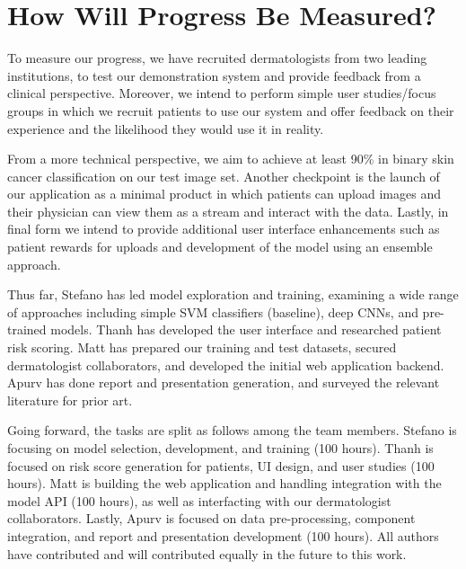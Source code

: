 \documentclass[a4paper,10pt]{article}
\begin{document}
\section{How Will Progress Be Measured?}
To measure our progress, we have recruited dermatologists from two leading
institutions, to test our demonstration system and provide feedback from a
clinical perspective. Moreover, we intend to perform simple user studies/focus
groups in which we recruit patients to use our system and offer feedback on
their experience and the likelihood they would use it in reality.

From a more technical perspective, we aim to achieve at least 90\% in binary
skin cancer classification on our test image set. Another checkpoint is the
launch of our application as a minimal product in which patients can upload
images and their physician can view them as a stream and interact with the
data. Lastly, in final form we intend to provide additional user interface
enhancements such as patient rewards for uploads and development of the model
using an ensemble approach.

Thus far, Stefano has led model exploration and training, examining a wide range
of approaches including simple SVM classifiers (baseline), deep CNNs, and
pre-trained models. Thanh has developed the user interface and researched
patient risk scoring. Matt has prepared our training and test datasets,
secured dermatologist collaborators, and developed the initial web application
backend. Apurv has done report and presentation generation, and surveyed the
relevant literature for prior art.

Going forward, the tasks are split as follows among the team members.
Stefano is focusing on model selection, development, and training (100 hours).
Thanh is focused on risk score generation for patients, UI design, and user
studies (100 hours). Matt is building the web application and handling
integration with the model API (100 hours), as well as interfacting with our
dermatologist collaborators. Lastly, Apurv is focused on data pre-processing,
component integration, and report and presentation development (100 hours). All
authors have contributed and will contributed equally in the future to this
work.


\end{document}
